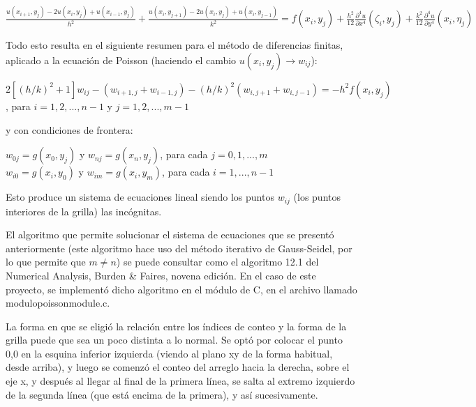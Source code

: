 \documentclass[letter]{article}
\begin{document}
\begin{center}
$\displaystyle \frac{u(x_{i+1},y_{j})-2u(x_{i},y_{j})+u(x_{i-1},y_{j})}{h^{2}}+\frac{u(x_{i},y_{j+1})-2u(x_{i},y_{j})+u(x_{i},y_{j-1})}{k^{2}}=f(x_{i},y_{j})+\frac{h^{2}}{12}\frac{\partial^{4}u}{\partial x^{4}}(\zeta_{i},y_{j})+\frac{k^{2}}{12}\frac{\partial^{4}u}{\partial y^{4}}(x_{i},\eta_{j})$
\end{center}

Todo esto resulta en el siguiente resumen para el método de diferencias finitas, aplicado a la ecuación de Poisson (haciendo el cambio $\displaystyle u(x_{i},y_{j})\rightarrow w_{ij}$):

\begin{center}
$\displaystyle 2[(h/k)^{2}+1]w_{ij}-(w_{i+1,j}+w_{i-1,j})-(h/k)^{2}(w_{i,j+1}+w_{i,j-1})=-h^{2}f(x_{i},y_{j})$, para $\displaystyle i=1,2,...,n-1$ y $\displaystyle j=1,2,...,m-1$
\end{center}

y con condiciones de frontera:

\begin{center}
$\displaystyle w_{0j}=g(x_{0},y_{j})$ y $\displaystyle w_{nj}=g(x_{n},y_{j})$, para cada $\displaystyle j=0,1,...,m$\\
$\displaystyle w_{i0}=g(x_{i},y_{0})$ y $\displaystyle w_{im}=g(x_{i},y_{m})$, para cada $\displaystyle i=1,...,n-1$
\end{center}

Esto produce un sistema de ecuaciones lineal siendo los puntos $\displaystyle w_{ij}$ (los puntos interiores de la grilla) las incógnitas.

El algoritmo que permite solucionar el sistema de ecuaciones que se presentó anteriormente (este algoritmo hace uso del método iterativo de Gauss-Seidel, por lo que permite que $\displaystyle m\neq n$) se puede consultar como el algoritmo 12.1 del Numerical Analysis, Burden \& Faires, novena edición. En el caso de este proyecto, se implementó dicho algoritmo en el módulo de C, en el archivo llamado modulopoissonmodule.c.

La forma en que se eligió la relación entre los índices de conteo y la forma de la grilla puede que sea un poco distinta a lo normal. Se optó por colocar el punto 0,0 en la esquina inferior izquierda (viendo al plano xy de la forma habitual, desde arriba), y luego se comenzó el conteo del arreglo hacia la derecha, sobre el eje x, y después al llegar al final de la primera línea, se salta al extremo izquierdo de la segunda línea (que está encima de la primera), y así sucesivamente.
\end{document}
